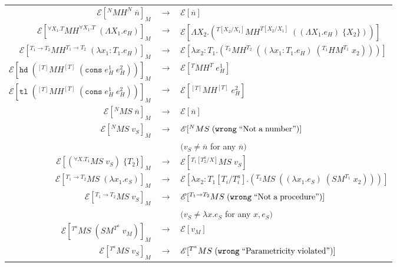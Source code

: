 \begin{figure}
\onehalfspacing
\begin{center}
\begin{tabular}{rcl}
$\mathscr{E}[^{N}MH^{N}\;\overline{n}]_{M}$ & $\rightarrow$ & $\mathscr{E}[\overline{n}]$ \\
$\mathscr{E}[^{\forall X_{1}.T}MH^{\forall X_{1}.T}\;(\Lambda X_{1}.e_{H})]_{M}$ & $\rightarrow$ & $\mathscr{E}[\Lambda X_{2}.(^{T[X_{2}/X_{1}]}MH^{T[X_{2}/X_{1}]}\;((\Lambda X_{1}.e_{H})\;\lbrace X_{2}\rbrace))]$ \\
$\mathscr{E}[^{T_{1}\rightarrow T_{2}}MH^{T_{1}\rightarrow T_{2}}\;(\lambda x_{1}:T_{1}.e_{H})]_{M}$ & $\rightarrow$ & $\mathscr{E}[\lambda x_{2}:T_{1}.(^{T_{2}}MH^{T_{2}}\;((\lambda x_{1}:T_{1}.e_{H})\;(^{T_{1}}HM^{T_{1}}\;x_{2})))]$ \\
$\mathscr{E}[\mathtt{hd}\;(^{[T]}MH^{[T]}\;(\mathtt{cons}\;e_{H}^{1}\;e_{H}^{2}))]_{M}$ & $\rightarrow$ & $\mathscr{E}[^{T}MH^{T}\;e_{H}^{1}]$ \\
$\mathscr{E}[\mathtt{tl}\;(^{[T]}MH^{[T]}\;(\mathtt{cons}\;e_{H}^{1}\;e_{H}^{2}))]_{M}$ & $\rightarrow$ & $\mathscr{E}[^{[T]}MH^{[T]}\;e_{H}^{2}]$ \\
$\mathscr{E}[^{N}MS\;\overline{n}]_{M}$ & $\rightarrow$ & $\mathscr{E}[\overline{n}]$ \\
$\mathscr{E}[^{N}MS\;v_{S}]_{M}$ & $\rightarrow$ & $\mathscr{E}[^{N}MS\;(\mathtt{wrong}\;\mathrm{``Not\;a\;number"})]$ \\
&& $(v_{S}\neq\overline{n}$ for any $\overline{n})$ \\
$\mathscr{E}[(^{\forall X.T_{1}}MS\;v_{S})\;\lbrace T_{2}\rbrace]_{M}$ & $\rightarrow$ & $\mathscr{E}[^{T_{1}[T^{a}_{2}/X]}MS\;v_{S}]$ \\
$\mathscr{E}[^{T_{1}\rightarrow T_{2}}MS\;(\lambda x_{1}.e_{S})]_{M}$ & $\rightarrow$ & $\mathscr{E}[\lambda x_{2}:T_{1}[T_{i}/T^{a}_{i}].(^{T_{2}}MS\;((\lambda x_{1}.e_{S})\;(SM^{T_{1}}\;x_{2})))]$ \\
$\mathscr{E}[^{T_{1}\rightarrow T_{2}}MS\;v_{S}]_{M}$ & $\rightarrow$ & $\mathscr{E}[^{T_{1}\rightarrow T_{2}}MS\;(\mathtt{wrong}\;\mathrm{``Not\;a\;procedure"})]$ \\
&& $(v_{S}\neq\lambda x.e_{S}$ for any $x,e_{S})$ \\
$\mathscr{E}[^{T^{a}}MS\;(SM^{T^{a}}\;v_{M})]_{M}$ & $\rightarrow$ & $\mathscr{E}[v_{M}]$ \\
$\mathscr{E}[^{T^{a}}MS\;v_{S}]_{M}$ & $\rightarrow$ & $\mathscr{E}[^{T^{a}}MS\;(\mathtt{wrong}\;\mathrm{``Parametricity\;violated"})]$ \\

\end{tabular}
\end{center}
\end{figure}
